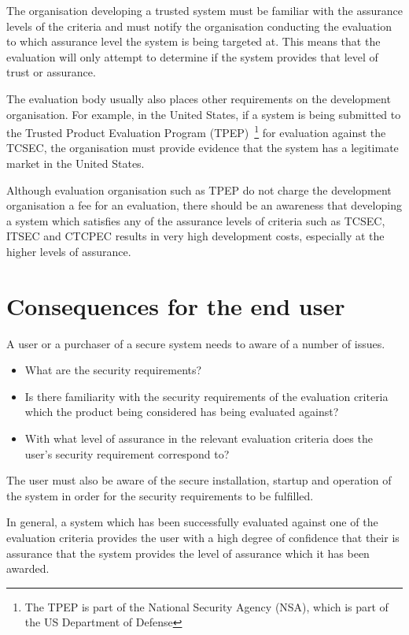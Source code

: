     The organisation developing a trusted system must be familiar with the assurance levels of the
    criteria and must notify the organisation conducting the evaluation
    to which assurance level the system is being targeted at. This means
    that the evaluation will only attempt to determine if the system
    provides that level of trust or assurance. 

    The evaluation body usually also places other requirements on the
    development organisation.
    For example, in the United States, if a system is being submitted
    to the Trusted Product Evaluation Program (TPEP)~\footnote{The TPEP
    is part of the National Security Agency (NSA), which is part of the
    US Department of Defense} for evaluation against the TCSEC,
    the organisation must provide evidence that
    the system has a legitimate market in the United States.

    Although evaluation organisation such as TPEP do not charge the
    development organisation a fee for an evaluation, there should be 
    an awareness that
    developing a system which satisfies any of the assurance levels of
    criteria such as TCSEC, ITSEC and CTCPEC results in very high
    development costs, especially at the higher levels of assurance.

\section{Consequences for the end user}

    A user or a purchaser of a secure system needs to aware of a number
    of issues.
    \begin{itemize}
        \item What are the security requirements?
        \item Is there familiarity with the security requirements
              of the evaluation criteria which the product being 
              considered has being evaluated against?
        \item With what level of assurance in the relevant evaluation
              criteria does the user's security requirement correspond
              to?
    \end{itemize}

    The user must also be aware of the secure installation, startup and
    operation of the system in order for the security requirements to be
    fulfilled.

    In general, a system which has been successfully evaluated against
    one of the evaluation criteria provides the user with a high degree
    of confidence that their is assurance that the system provides the
    level of assurance which it has been awarded.









